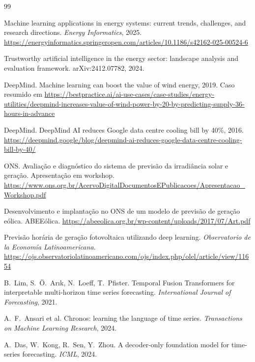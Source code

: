 \documentclass[10pt,a4paper,oneside]{article}
\begin{document}
\begin{thebibliography}{99}
\small

Machine learning applications in energy systems: current trends, challenges,
and research directions. \textit{Energy Informatics}, 2025.
\url{https://energyinformatics.springeropen.com/articles/10.1186/s42162-025-00524-6}

Trustworthy artificial intelligence in the energy sector: landscape analysis
and evaluation framework. arXiv:2412.07782, 2024.

DeepMind. Machine learning can boost the value of wind energy, 2019. Caso
resumido em
\url{https://bestpractice.ai/ai-use-cases/case-studies/energy-utilities/deepmind-increases-value-of-wind-power-by-20-by-predicting-supply-36-hours-in-advance}

DeepMind. DeepMind AI reduces Google data centre cooling bill by 40\%, 2016.
\url{https://deepmind.google/blog/deepmind-ai-reduces-google-data-centre-cooling-bill-by-40/}

ONS. Avaliação e diagnóstico do sistema de previsão da irradiância solar e
geração. Apresentação em workshop.
\url{https://www.ons.org.br/AcervoDigitalDocumentosEPublicacoes/Apresentacao_Workshop.pdf}

Desenvolvimento e implantação no ONS de um modelo de previsão de geração
eólica. ABEEólica.
\url{https://abeeolica.org.br/wp-content/uploads/2017/07/Art.pdf}

Previsão horária de geração fotovoltaica utilizando deep learning.
\textit{Observatorio de la Economía Latinoamericana}.
\url{https://ojs.observatoriolatinoamericano.com/ojs/index.php/olel/article/view/11654}

B.~Lim, S.~Ö.~Arık, N.~Loeff, T.~Pfister. Temporal Fusion Transformers for
interpretable multi-horizon time series forecasting. \textit{International
Journal of Forecasting}, 2021.

A.~F.~Ansari et al. Chronos: learning the language of time series.
\textit{Transactions on Machine Learning Research}, 2024.

A.~Das, W.~Kong, R.~Sen, Y.~Zhou. A decoder-only foundation model for
time-series forecasting. \textit{ICML}, 2024.


\end{thebibliography}
\end{document}
